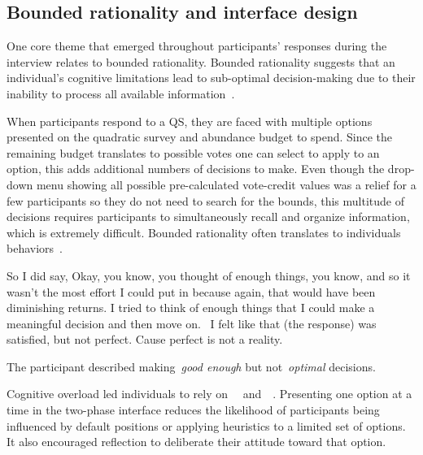 \subsection{Bounded rationality and interface design}
One core theme that emerged throughout participants' responses during the interview relates to bounded rationality. Bounded rationality suggests that an individual's cognitive limitations lead to sub-optimal decision-making due to their inability to process all available information~\cite{simonBehavioralModelRational1955}.

When participants respond to a QS, they are faced with multiple options presented on the quadratic survey and abundance budget to spend. Since the remaining budget translates to possible votes one can select to apply to an option, this adds additional numbers of decisions to make. Even though the drop-down menu showing all possible pre-calculated vote-credit values was a relief for a few participants so they do not need to search for the bounds, this multitude of decisions requires participants to simultaneously recall and organize information, which is extremely difficult. Bounded rationality often translates to individuals~\underline{} behaviors~\cite{gigerenzerReasoningFastFrugal1996}.

\begin{displayquote}
So I did say, Okay, you know, you thought of enough things, you know, and so it wasn't the most effort I could put in because again, that would have been diminishing returns. I tried to think of enough things that I could make a meaningful decision and then move on.~\bracketellipsis 
I felt like that (the response) was satisfied, but not perfect. Cause perfect is not a reality. \hfill{}
\end{displayquote}

The participant described making~\textit{good enough} but not~\textit{optimal} decisions.

Cognitive overload led individuals to rely on~\underline{}~\cite{tverskyJudgmentUncertaintyHeuristics1974} and~\underline{}~\cite{thalerNudgeImprovingDecisions2008a}. Presenting one option at a time in the two-phase interface reduces the likelihood of participants being influenced by default positions or applying heuristics to a limited set of options. It also encouraged reflection to deliberate their attitude toward that option.

